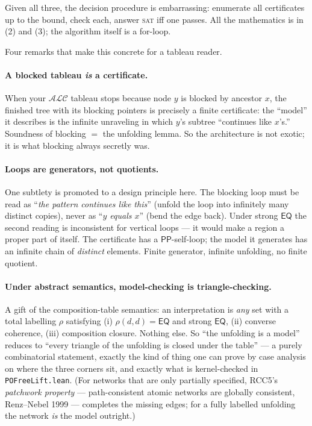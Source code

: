 \documentclass[11pt]{article}
\newcommand{\PP}{\ensuremath{\mathsf{PP}}}
\newcommand{\EQ}{\ensuremath{\mathsf{EQ}}}
\newcommand{\code}[1]{\texttt{#1}}
\begin{document}
Given all three, the decision procedure is embarrassing: enumerate all
certificates up to the bound, check each, answer \textsc{sat} iff one
passes. All the mathematics is in (2) and (3); the algorithm itself is
a for-loop.

Four remarks that make this concrete for a tableau reader.

\paragraph{A blocked tableau \emph{is} a certificate.} When your
$\mathcal{ALC}$ tableau stops because node $y$ is blocked by ancestor
$x$, the finished tree with its blocking pointers is precisely a finite
certificate: the ``model'' it describes is the infinite unraveling in
which $y$'s subtree ``continues like $x$'s.'' Soundness of blocking
$=$ the unfolding lemma. So the architecture is not exotic; it is what
blocking always secretly was.

\paragraph{Loops are generators, not quotients.} One subtlety is
promoted to a design principle here. The blocking loop must be read as
``\emph{the pattern continues like this}'' (unfold the loop into
infinitely many distinct copies), never as ``\emph{$y$ equals $x$}''
(bend the edge back). Under strong $\EQ$ the second reading is
inconsistent for vertical loops --- it would make a region a proper
part of itself. The certificate has a $\PP$-self-loop; the model it
generates has an infinite chain of \emph{distinct} elements. Finite
generator, infinite unfolding, no finite quotient.

\paragraph{Under abstract semantics, model-checking is
triangle-checking.} A gift of the composition-table semantics: an
interpretation is \emph{any} set with a total labelling $\rho$
satisfying (i) $\rho(d,d)=\EQ$ and strong $\EQ$, (ii) converse
coherence, (iii) composition closure. Nothing else. So ``the unfolding
is a model'' reduces to ``every triangle of the unfolding is closed
under the table'' --- a purely combinatorial statement, exactly the
kind of thing one can prove by case analysis on where the three corners
sit, and exactly what is kernel-checked in \code{POFreeLift.lean}. (For
networks that are only partially specified, RCC5's \emph{patchwork
property} --- path-consistent atomic networks are globally consistent,
Renz--Nebel 1999 --- completes the missing edges; for a fully labelled
unfolding the network \emph{is} the model outright.)
\end{document}

